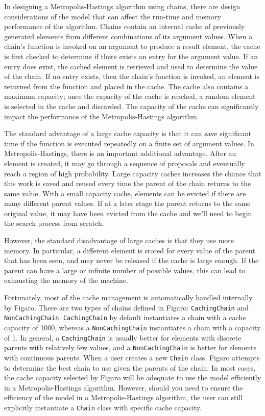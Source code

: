 In designing a Metropolis-Hastings algorithm using chains, there are design considerations of the model that can affect the run-time and memory performance of the algorithm. Chains contain an internal cache of previously generated elements from different combinations of its argument values. When a chain's function is invoked on an argument to produce a result element, the cache is first checked to determine if there exists an entry for the argument value. If an entry does exist, the cached element is retrieved and used to determine the value of the chain. If no entry exists, then the chain's function is invoked, an element is returned from the function and placed in the cache. The cache also contains a maximum capacity; once the capacity of the cache is reached, a random element is selected in the cache and discarded. The capacity of the cache can significantly impact the performance of the Metropolis-Hastings algorithm. 

The standard advantage of a large cache capacity is that it can save significant time if the function is executed repeatedly on a finite set of argument values. In Metropolis-Hastings, there is an important additional advantage. After an element is created, it may go through a sequence of proposals and eventually reach a region of high probability. Large capacity caches increases the chance that this work is saved and reused every time the parent of the chain returns to the same value. With a small capacity
cache, elements can be evicted if there are many different parent values. If at a later stage the parent returns to the same original value, it may have been evicted from the cache and we'll need to begin the
search process from scratch.

However, the standard disadvantage of large caches is that they use more memory. In particular, a different element is stored for every value of the parent that has been seen, and may never be released if the cache is large enough. If the parent can have a large or infinite number of possible values, this can lead to exhausting the memory of the machine.

Fortunately, most of the cache management is automatically handled internally by Figaro. There are two types of chains defined in Figaro: \texttt{CachingChain} and \texttt{NonCachingChain}. \texttt{CachingChain} by default instantiates a chain with a cache capacity of 1000, whereas a \texttt{NonCachi\-ngChain} instantiates a chain with a capacity of 1. In general, a \texttt{Caching\-Chain} is usually better for elements with discrete parents with relatively few values, and a \texttt{NonCachingChain} is better for elements with continuous parents. When a user creates a new \texttt{Chain} class, Figaro attempts to determine the best chain to use given the parents of the chain. In most cases, the cache capacity selected by Figaro will be adequate to use the model efficiently in a Metropolis-Hastings algorithm. However, should you need to ensure the efficiency of the model in a Metropolis-Hastings algorithm, the user can still explicitly instantiate a \texttt{Chain} class with specific cache capacity.

